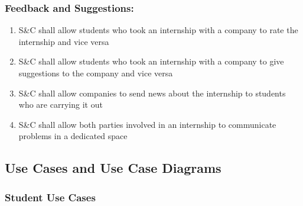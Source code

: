     \subsubsection*{Feedback and Suggestions:}
        \begin{enumerate}[label=\textbf{R\arabic*},resume]
            \item S\&C shall allow students who took an internship with a company to rate the internship and vice versa
            \item S\&C shall allow students who took an internship with a company to give suggestions to the company and vice versa
            \item S\&C shall allow companies to send news about the internship to students who are carrying it out
            \item S\&C shall allow both parties involved in an internship to communicate problems in a dedicated space
        \end{enumerate}
        
\newpage

\subsection{Use Cases and Use Case Diagrams}

    \subsubsection{Student Use Cases}
    
